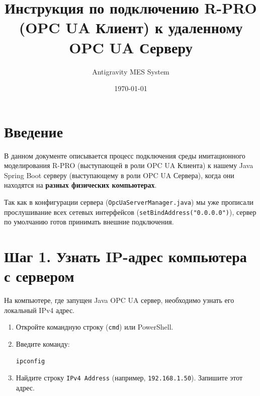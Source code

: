 \documentclass[12pt,a4paper]{article}
\title{Инструкция по подключению R-PRO (OPC UA Клиент) к удаленному OPC UA Серверу}
\author{Antigravity MES System}
\date{\today}
\begin{document}
\maketitle

\section{Введение}
В данном документе описывается процесс подключения среды имитационного моделирования R-PRO (выступающей в роли OPC UA Клиента) к нашему Java Spring Boot серверу (выступающему в роли OPC UA Сервера), когда они находятся на \textbf{разных физических компьютерах}.

Так как в конфигурации сервера (\texttt{OpcUaServerManager.java}) мы уже прописали прослушивание всех сетевых интерфейсов (\texttt{setBindAddress("0.0.0.0")}), сервер по умолчанию готов принимать внешние подключения.

\section{Шаг 1. Узнать IP-адрес компьютера с сервером}
На компьютере, где запущен Java OPC UA сервер, необходимо узнать его локальный IPv4 адрес.
\begin{enumerate}
    \item Откройте командную строку (\texttt{cmd}) или PowerShell.
    \item Введите команду:
    \begin{lstlisting}[language=bash]
    ipconfig
    \end{lstlisting}
    \item Найдите строку \texttt{IPv4 Address} (например, \texttt{192.168.1.50}). Запишите этот адрес.
\end{enumerate}
\end{document}
